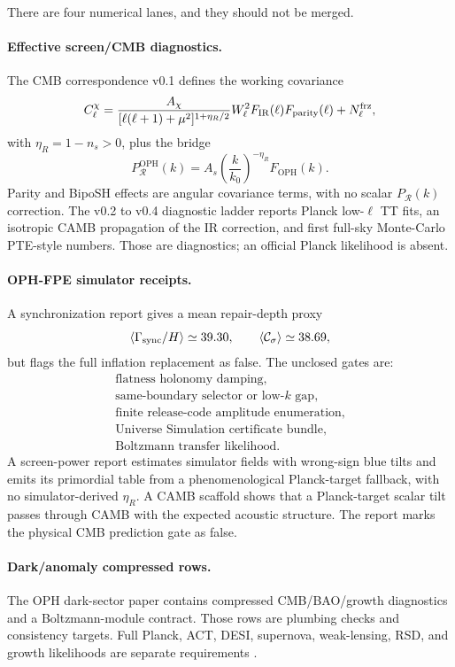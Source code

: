 \documentclass[11pt]{article}
\newcommand{\OPH}{\mathrm{OPH}}
\begin{document}
There are four numerical lanes, and they should not be merged.

\paragraph{Effective screen/CMB diagnostics.}
The CMB correspondence v0.1 defines the working covariance
\[
C_\ell^\chi
=
\frac{A_\chi}{[\ell(\ell+1)+\mu^2]^{1+\eta_R/2}}
W_\ell^2F_{\rm IR}(\ell)F_{\rm parity}(\ell)+N_\ell^{\rm frz},
\]
with \(\eta_R=1-n_s>0\), plus the bridge
\[
P_{\mathcal R}^{\OPH}(k)=
A_s\left(\frac{k}{k_0}\right)^{-\eta_R}F_{\OPH}(k).
\]
Parity and BipoSH effects are angular covariance terms, with no scalar \(P_{\mathcal R}(k)\)
correction. The v0.2 to v0.4 diagnostic ladder reports Planck low-\(\ell\) TT fits, an isotropic
CAMB propagation of the IR correction, and first full-sky Monte-Carlo PTE-style numbers. Those are
diagnostics; an official Planck likelihood is absent.

\paragraph{OPH-FPE simulator receipts.}
A synchronization report gives a mean repair-depth proxy
\[
\langle\Gamma_{\rm sync}/H\rangle\simeq39.30,
\qquad
\langle\mathcal C_\sigma\rangle\simeq38.69,
\]
but flags the full inflation replacement as false. The unclosed gates are:
\[
\begin{gathered}
\text{flatness holonomy damping},\\
\text{same-boundary selector or low-\(k\) gap},\\
\text{finite release-code amplitude enumeration},\\
\text{Universe Simulation certificate bundle},\\
\text{Boltzmann transfer likelihood}.
\end{gathered}
\]
A screen-power report estimates simulator fields with wrong-sign blue tilts and emits
its primordial table from a phenomenological Planck-target fallback, with no simulator-derived
\(\eta_R\). A CAMB scaffold shows that a Planck-target scalar
tilt passes through CAMB with the expected acoustic structure. The report marks
the physical CMB prediction gate as false.

\paragraph{Dark/anomaly compressed rows.}
The OPH dark-sector paper contains compressed CMB/BAO/growth diagnostics and a Boltzmann-module
contract. Those rows are plumbing checks and consistency targets. Full Planck, ACT, DESI, supernova,
weak-lensing, RSD, and growth likelihoods are separate requirements
\cite{planck2018,actdr6,desi2025}.
\end{document}
